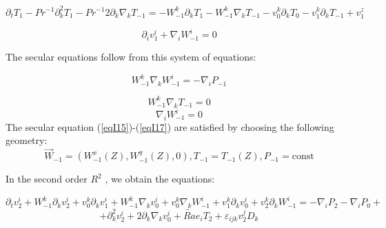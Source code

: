 \documentclass [12pt]{article}
\begin{document}
\begin{equation}\label{eqI13} \partial
_{t} T_{1} -Pr^{-1} \partial _{k}^{2} T_{1} -Pr^{-1}2\partial _{k} \nabla _{k} T_{-1}
=-W_{-1}^{k} \partial _{k} T_{1} -W_{-1}^{k} \nabla _{k} T_{-1}
-v_{0}^{k} \partial _{k} T_{0} -v_{1}^{k} \partial _{k} T_{-1} +v_{1}^{z} \end{equation}

 \begin{equation}\label{eqI14} \partial
_{i} v_{1}^{i} +\nabla _{i} W_{-1}^{i} =0 \end{equation}

The secular equations follow from this system of equations:

 \begin{equation}\label{eqI15} W_{-1}^{k} \nabla _{k} W_{-1}^{i} =-\nabla _{i} P_{-1} \end{equation}

\begin{equation}\label{eqI16} W_{-1}^{k}
\nabla _{k} T_{-1} =0 \end{equation}                                                                                                                      \begin{equation}\label{eqI17} \nabla
_{i} W_{-1}^{i} =0 \end{equation}                                                                                                                      The secular equation (\ref{eqI15})-(\ref{eqI17}) are satisfied by choosing the following geometry:
\begin{equation}\label{eqI18}\vec{W}_{-1} =\left(W_{-1}^{x} \left(Z\right),W_{-1}^{y} \left(Z\right),0\right),T_{-1} =T_{-1} \left(Z\right),P_{-1} =\textrm{const} \end{equation}

In the second order   $R^{2} $ , we obtain the equations:

 \[\partial _{t} v_{2}^{i} +W_{-1}^{k} \partial _{k} v_{2}^{i} +v_{0}^{k}
\partial _{k} v_{1}^{i} +W_{-1}^{k} \nabla _{k} v_{0}^{i} +v_{0}^{k} \nabla _{k}
W_{-1}^{i} +v_{1}^{k} \partial _{k} v_{0}^{i} +v_{2}^{k} \partial _{k} W_{-1}^{i}
=-\nabla _{i} P_{2} -\nabla _{i} P_{0} +\]
\begin{equation}\label{eqI19}
{+\partial _{k}^{2} v_{2}^{i} +2\partial
_{k} \nabla _{k} v_{0}^{i} +\widetilde{Ra}e_{i} T_{2} +{\varepsilon }_{ijk} {v}_{2}^{j}
{D}_{k} }  \end{equation}
\end{document}
